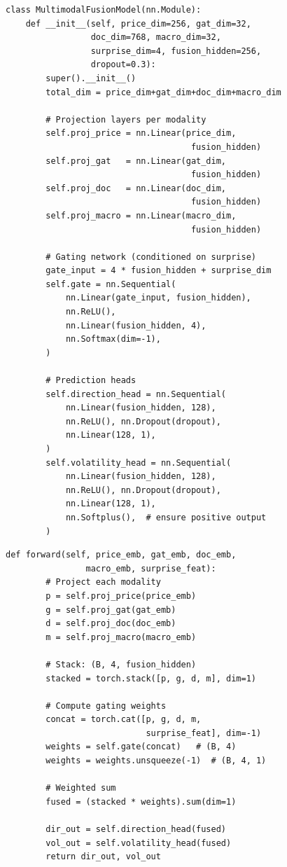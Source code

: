 \documentclass[12pt, a4paper]{article}
\begin{document}
\begin{lstlisting}[caption={Multimodal fusion with gated attention (V2)}]
class MultimodalFusionModel(nn.Module):
    def __init__(self, price_dim=256, gat_dim=32,
                 doc_dim=768, macro_dim=32,
                 surprise_dim=4, fusion_hidden=256,
                 dropout=0.3):
        super().__init__()
        total_dim = price_dim+gat_dim+doc_dim+macro_dim
        
        # Projection layers per modality
        self.proj_price = nn.Linear(price_dim,
                                     fusion_hidden)
        self.proj_gat   = nn.Linear(gat_dim,
                                     fusion_hidden)
        self.proj_doc   = nn.Linear(doc_dim,
                                     fusion_hidden)
        self.proj_macro = nn.Linear(macro_dim,
                                     fusion_hidden)
        
        # Gating network (conditioned on surprise)
        gate_input = 4 * fusion_hidden + surprise_dim
        self.gate = nn.Sequential(
            nn.Linear(gate_input, fusion_hidden),
            nn.ReLU(),
            nn.Linear(fusion_hidden, 4),
            nn.Softmax(dim=-1),
        )
        
        # Prediction heads
        self.direction_head = nn.Sequential(
            nn.Linear(fusion_hidden, 128),
            nn.ReLU(), nn.Dropout(dropout),
            nn.Linear(128, 1),
        )
        self.volatility_head = nn.Sequential(
            nn.Linear(fusion_hidden, 128),
            nn.ReLU(), nn.Dropout(dropout),
            nn.Linear(128, 1),
            nn.Softplus(),  # ensure positive output
        )
\end{lstlisting}

\begin{lstlisting}[caption={Fusion forward pass}]
    def forward(self, price_emb, gat_emb, doc_emb,
                macro_emb, surprise_feat):
        # Project each modality
        p = self.proj_price(price_emb)
        g = self.proj_gat(gat_emb)
        d = self.proj_doc(doc_emb)
        m = self.proj_macro(macro_emb)
        
        # Stack: (B, 4, fusion_hidden)
        stacked = torch.stack([p, g, d, m], dim=1)
        
        # Compute gating weights
        concat = torch.cat([p, g, d, m,
                            surprise_feat], dim=-1)
        weights = self.gate(concat)   # (B, 4)
        weights = weights.unsqueeze(-1)  # (B, 4, 1)
        
        # Weighted sum
        fused = (stacked * weights).sum(dim=1)
        
        dir_out = self.direction_head(fused)
        vol_out = self.volatility_head(fused)
        return dir_out, vol_out
\end{lstlisting}
\end{document}

